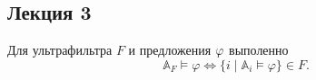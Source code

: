 

\subsection*{Лекция 3}

\begin{stat}[Следствие]
    Для ультрафильтра $F$ и предложения $\varphi$ выполенно
    $$\mathbb{A}_F \models \varphi \Longleftrightarrow \{i \mid \mathbb{A}_i \models \varphi\} \in F.$$
\end{stat} 

